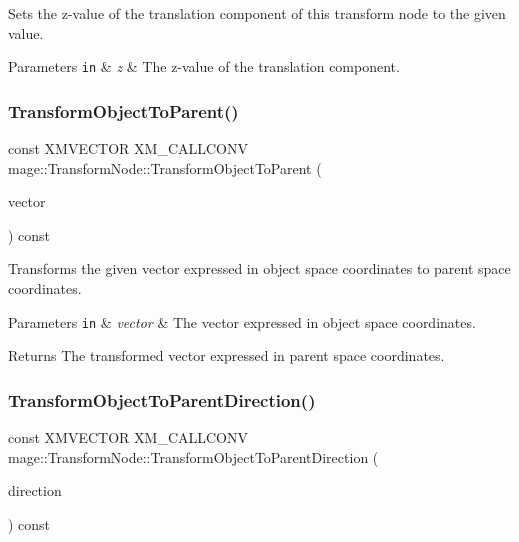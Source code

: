 Sets the z-\/value of the translation component of this transform node to the given value.


\begin{DoxyParams}[1]{Parameters}
\mbox{\tt in}  & {\em z} & The z-\/value of the translation component. \\
\hline
\end{DoxyParams}
\hypertarget{structmage_1_1_transform_node_a8a19577750036d8365cca5b4e38c08b9}{}\label{structmage_1_1_transform_node_a8a19577750036d8365cca5b4e38c08b9} 
\subsubsection{\texorpdfstring{Transform\+Object\+To\+Parent()}{TransformObjectToParent()}}
{\footnotesize\ttfamily const X\+M\+V\+E\+C\+T\+OR X\+M\+\_\+\+C\+A\+L\+L\+C\+O\+NV mage\+::\+Transform\+Node\+::\+Transform\+Object\+To\+Parent (\begin{DoxyParamCaption}\item[{F\+X\+M\+V\+E\+C\+T\+OR}]{vector }\end{DoxyParamCaption}) const\hspace{0.3cm}{\ttfamily [noexcept]}}

Transforms the given vector expressed in object space coordinates to parent space coordinates.


\begin{DoxyParams}[1]{Parameters}
\mbox{\tt in}  & {\em vector} & The vector expressed in object space coordinates. \\
\hline
\end{DoxyParams}
\begin{DoxyReturn}{Returns}
The transformed vector expressed in parent space coordinates. 
\end{DoxyReturn}
\hypertarget{structmage_1_1_transform_node_af3f7d31eeb595ac51fe2362c91688398}{}\label{structmage_1_1_transform_node_af3f7d31eeb595ac51fe2362c91688398} 
\subsubsection{\texorpdfstring{Transform\+Object\+To\+Parent\+Direction()}{TransformObjectToParentDirection()}}
{\footnotesize\ttfamily const X\+M\+V\+E\+C\+T\+OR X\+M\+\_\+\+C\+A\+L\+L\+C\+O\+NV mage\+::\+Transform\+Node\+::\+Transform\+Object\+To\+Parent\+Direction (\begin{DoxyParamCaption}\item[{F\+X\+M\+V\+E\+C\+T\+OR}]{direction }\end{DoxyParamCaption}) const\hspace{0.3cm}{\ttfamily [noexcept]}}

